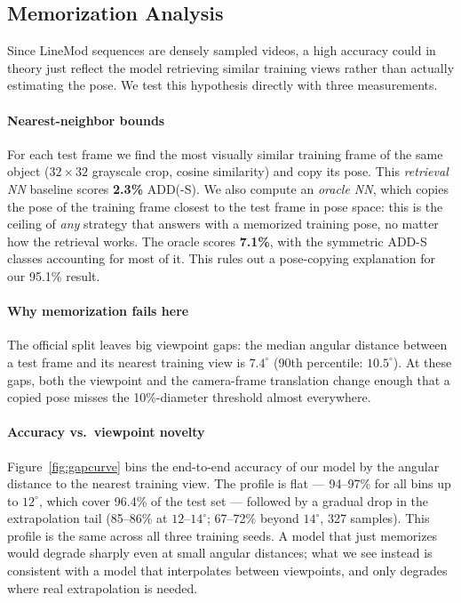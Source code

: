 \subsection{Memorization Analysis}
\label{sec:exp_memorization}

Since LineMod sequences are densely sampled videos, a high accuracy could in theory just reflect the model retrieving similar training views rather than actually estimating the pose. We test this hypothesis directly with three measurements.

\paragraph{Nearest-neighbor bounds}
For each test frame we find the most visually similar training frame of the same object ($32{\times}32$ grayscale crop, cosine similarity) and copy its pose. This \emph{retrieval NN} baseline scores \textbf{2.3\%} ADD(-S). We also compute an \emph{oracle NN}, which copies the pose of the training frame closest to the test frame in pose space: this is the ceiling of \emph{any} strategy that answers with a memorized training pose, no matter how the retrieval works. The oracle scores \textbf{7.1\%}, with the symmetric ADD-S classes accounting for most of it. This rules out a pose-copying explanation for our 95.1\% result.

\paragraph{Why memorization fails here}
The official split leaves big viewpoint gaps: the median angular distance between a test frame and its nearest training view is $7.4^\circ$ (90th percentile: $10.5^\circ$). At these gaps, both the viewpoint and the camera-frame translation change enough that a copied pose misses the 10\%-diameter threshold almost everywhere.

\paragraph{Accuracy vs.\ viewpoint novelty}
Figure~\ref{fig:gapcurve} bins the end-to-end accuracy of our model by the angular distance to the nearest training view. The profile is flat --- 94--97\% for all bins up to $12^\circ$, which cover 96.4\% of the test set --- followed by a gradual drop in the extrapolation tail (85--86\% at $12$--$14^\circ$; 67--72\% beyond $14^\circ$, 327 samples). This profile is the same across all three training seeds. A model that just memorizes would degrade sharply even at small angular distances; what we see instead is consistent with a model that interpolates between viewpoints, and only degrades where real extrapolation is needed.

